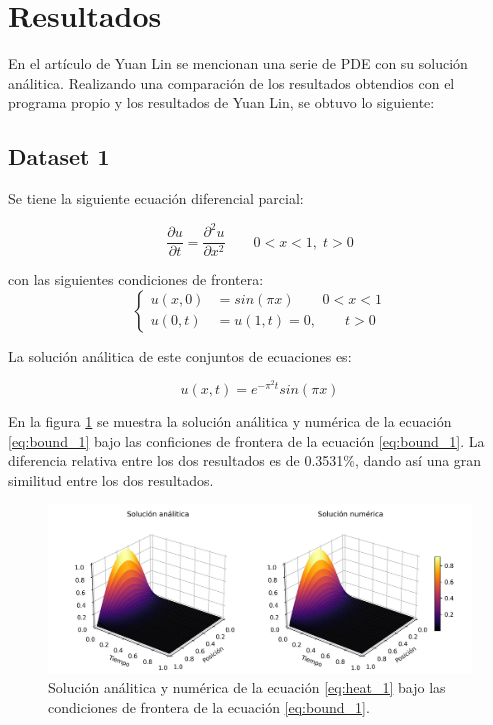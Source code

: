 \section{Resultados}

En el artículo de Yuan Lin\cite{yuan_2009} se mencionan una serie de PDE con su solución análitica. Realizando una comparación de los resultados obtendios con el programa propio y los resultados de Yuan Lin, se obtuvo lo siguiente:

\subsection{Dataset 1}

Se tiene la siguiente ecuación diferencial parcial:

\begin{equation}
	\frac{\partial u}{\partial t} = \frac{\partial^2 u}{\partial x^2} \qquad 0<x<1, \; t>0 \label{eq:heat_1}
\end{equation}

con las siguientes condiciones de frontera:
\begin{equation}
	\begin{cases}
		u(x,0) & = sin(\pi x) \qquad 0<x<1 \\
		u(0,t) & =u(1,t) = 0, \qquad t>0
	\end{cases} \label{eq:bound_1}
\end{equation}

La solución análitica de este conjuntos de ecuaciones es:

\begin{equation}
	u(x,t)= e^{-\pi^2 t}sin(\pi x) \label{eq:sol_1}
\end{equation}

En la figura \ref{fig:sol_1} se muestra la solución análitica y numérica de la ecuación \ref{eq:bound_1} bajo las conficiones de frontera de la ecuación \ref{eq:bound_1}. La diferencia relativa entre los dos resultados es de 0.3531\%, dando así una gran similitud entre los dos resultados.

\begin{figure}[H]
	\centering
	\includegraphics[width=17cm]{Graphics/surface_1.png}
	\caption{Solución análitica y numérica de la ecuación \ref{eq:heat_1} bajo las condiciones de frontera de la ecuación \ref{eq:bound_1}.}
	\label{fig:sol_1}
\end{figure}

